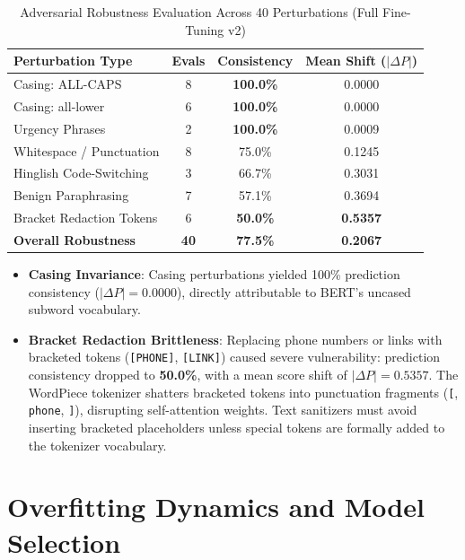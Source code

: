 \documentclass[conference]{IEEEtran}
\begin{document}
\begin{table}[t]
\caption{Adversarial Robustness Evaluation Across 40 Perturbations (Full Fine-Tuning v2)}
\label{tab:robustness_results}
\centering
\begin{tabularx}{\columnwidth}{Xccc}
\toprule
\textbf{Perturbation Type} & \textbf{Evals} & \textbf{Consistency} & \textbf{Mean Shift ($|\Delta P|$)} \\
\midrule
Casing: ALL-CAPS & 8 & \textbf{100.0\%} & 0.0000 \\
Casing: all-lower & 6 & \textbf{100.0\%} & 0.0000 \\
Urgency Phrases & 2 & \textbf{100.0\%} & 0.0009 \\
Whitespace / Punctuation & 8 & 75.0\% & 0.1245 \\
Hinglish Code-Switching & 3 & 66.7\% & 0.3031 \\
Benign Paraphrasing & 7 & 57.1\% & 0.3694 \\
Bracket Redaction Tokens & 6 & \textbf{50.0\%} & \textbf{0.5357} \\
\midrule
\textbf{Overall Robustness} & \textbf{40} & \textbf{77.5\%} & \textbf{0.2067} \\
\bottomrule
\end{tabularx}
\end{table}

\begin{itemize}
    \item \textbf{Casing Invariance}: Casing perturbations yielded 100\% prediction consistency ($|\Delta P| = 0.0000$), directly attributable to BERT's uncased subword vocabulary.
    \item \textbf{Bracket Redaction Brittleness}: Replacing phone numbers or links with bracketed tokens (\texttt{[PHONE]}, \texttt{[LINK]}) caused severe vulnerability: prediction consistency dropped to \textbf{50.0\%}, with a mean score shift of \textbf{$|\Delta P| = 0.5357$}. The WordPiece tokenizer shatters bracketed tokens into punctuation fragments (\texttt{[}, \texttt{phone}, \texttt{]}), disrupting self-attention weights. Text sanitizers must avoid inserting bracketed placeholders unless special tokens are formally added to the tokenizer vocabulary.
\end{itemize}

\section{Overfitting Dynamics and Model Selection}
\label{sec:overfitting_selection}
\end{document}
